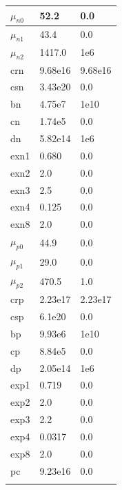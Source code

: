 \begin{longtable}[htbp]{|
>{\setlength{\hsize}{0.5\hsize}}Y|
>{\setlength{\hsize}{0.5\hsize}}Y|
>{\setlength{\hsize}{0.5\hsize}}Y|}
  $\mu_{n0}$  &  52.2    &  0.0  \\ \hline
  $\mu_{n1}$  &  43.4    &  0.0  \\ \hline
  $\mu_{n2}$  & 1417.0   &  1e6  \\ \hline
  crn         & 9.68e16  & 9.68e16 \\ \hline
  csn         & 3.43e20  &  0.0   \\ \hline
  bn          & 4.75e7   &  1e10  \\ \hline
  cn          & 1.74e5   &   0.0  \\ \hline
  dn          & 5.82e14  &  1e6   \\ \hline
  exn1        & 0.680    &  0.0   \\ \hline
  exn2        &  2.0     &  0.0   \\ \hline
  exn3        &  2.5     &  0.0   \\ \hline
  exn4        & 0.125    &  0.0   \\ \hline
  exn8        &  2.0     &  0.0   \\ \hline
  $\mu_{p0}$  & 44.9     &  0.0   \\ \hline
  $\mu_{p1}$  & 29.0     &  0.0   \\ \hline
  $\mu_{p2}$  & 470.5    &  1.0   \\ \hline
  crp         & 2.23e17  & 2.23e17 \\ \hline
  csp         & 6.1e20   & 0.0     \\ \hline
  bp          & 9.93e6   & 1e10   \\ \hline
  cp          & 8.84e5   & 0.0    \\ \hline
  dp          & 2.05e14  & 1e6   \\ \hline
  exp1        & 0.719    &  0.0  \\ \hline
  exp2        & 2.0      &  0.0  \\ \hline
  exp3        & 2.2      &  0.0  \\ \hline
  exp4        & 0.0317   &  0.0  \\ \hline
  exp8        & 2.0      &  0.0  \\ \hline
  pc          & 9.23e16  &  0.0  \\ \hline
\label{lombardiMobModTbl}
\end{longtable}
